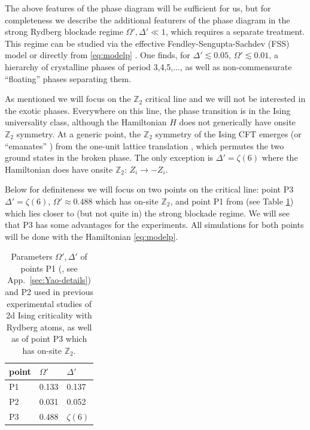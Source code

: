 \documentclass[a4paper,11pt]{article}
\theoremstyle{remark}
\theoremstyle{theorem}
\begin{document}
The above features of the phase diagram will be sufficient for us, but for
completeness we describe the additional featurers of the phase diagram in the
strong Rydberg blockade regime $\Omega', \Delta' \ll 1$, which requires a
separate treatment. This regime can be studied via the effective
Fendley-Sengupta-Sachdev (FSS) model {\cite{FSS}} or directly from
\eqref{eq:modelp} {\cite{Keesling:2018ish,Rader:2019syq}}. One finds, for
$\Delta' \lesssim 0.05$, $\Omega' \lesssim 0.01$, a hierarchy of crystalline
phases of period 3,4,5,..., as well as non-commensurate ``floating'' phases
separating them.

As mentioned we will focus on the $\mathbb{Z}_2$ critical line and we will not
be interested in the exotic phases. Everywhere on this line, the phase
transition is in the Ising universality class, although the Hamiltonian
$H$ does not generically have onsite $\mathbb{Z}_2$ symmetry. At a
generic point, the $\mathbb{Z}_2$ symmetry of the Ising CFT emerges (or
``emanates'' {\cite{Seiberg:2023cdc}}) from the one-unit lattice translation
{\cite{Slagle:2021ene}}, which permutes the two ground states in the broken
phase. The only exception is $\Delta' = \zeta (6)$ where the Hamiltonian does
have onsite $\mathbb{Z}_2$: $Z_i \to - Z_i$.

Below for definiteness we will focus on two points on the critical line:
point P3 $\Delta' = \zeta (6)$, $\Omega' \approx 0.488$ which has on-site
$\mathbb{Z}_2$, and point P1 from {\cite{Fang:2024uyf}} (see Table
\ref{tab:params}) which lies closer to (but not quite in) the strong blockade
regime. We will see that P3 has some advantages for the experiments. All
simulations for both points will be done with the Hamiltonian
\eqref{eq:modelp}.

\begin{table}[h]
	\centering
	\begin{tabular}{lll}
		\toprule
		point & $\Omega'$ & $\Delta'$\\\midrule
		P1{\cite{Fang:2024uyf}} & 0.133 & 0.137\\
		P2{\cite{Sun:2026aqf}} & 0.031 & 0.052\\
		P3 & $0.488$ & $\zeta (6)$\\
		\bottomrule
	\end{tabular}
	\caption{\label{tab:params}Parameters $\Omega', \Delta'$ of points P1 (\cite{Fang:2024uyf}, see App.~\ref{sec:Yao-details}) and P2
		\cite{Sun:2026aqf} used in previous experimental studies of 2d Ising criticality with Rydberg
		atoms, as well as of point P3 which has
		on-site $\mathbb{Z}_2$. }
\end{table}
\end{document}
